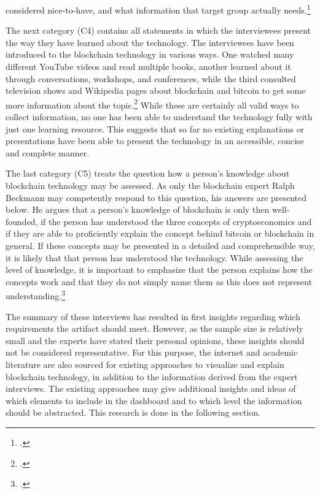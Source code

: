 considered nice-to-have, and what information that target group actually needs.\footcites[Cf.][P80, P81, P87]{BjoernPaulewicz_Interview}[cf.][P120]{RalphBeckmann_Interview}

The next category (C4) contains all statements in which the interviewees present the way they have learned about the technology. The interviewees have been introduced to the blockchain technology in various ways. One watched many different YouTube videos and read multiple books, another learned about it through conversations, workshops, and conferences, while the third consulted television shows and Wikipedia pages about blockchain and bitcoin to get some more information about the topic.\footcites[Cf.][P6]{BjoernPaulewicz_Interview}[cf.][P72, P90]{BjoernPaulewicz_Interview}[cf.][P93, P94, P101]{RalphBeckmann_Interview} While these are certainly all valid ways to collect information, no one has been able to understand the technology fully with just one learning resource. This suggests that so far no existing explanations or presentations have been able to present the technology in an accessible, concise and complete manner.

The last category (C5) treats the question how a person's knowledge about blockchain technology may be assessed. As only the blockchain expert Ralph Beckmann may competently respond to this question, his answers are presented below. He argues that a person's knowledge of blockchain is only then well-founded, if the person has understood the three concepts of cryptoeconomics and if they are able to proficiently explain the concept behind bitcoin or blockchain in general. If these concepts may be presented in a detailed and comprehensible way, it is likely that that person has understood the technology. While assessing the level of knowledge, it is important to emphasize that the person explains how the concepts work and that they do not simply name them as this does not represent understanding.\footcites[Cf.][P100, P102, P108, P111, P118, P129, P130]{RalphBeckmann_Interview}

The summary of these interviews has resulted in first insights regarding which requirements the artifact should meet. However, as the sample size is relatively small and the experts have stated their personal opinions, these insights should not be considered representative. For this purpose, the internet and academic literature are also sourced for existing approaches to visualize and explain blockchain technology, in addition to the information derived from the expert interviews. The existing approaches may give additional insights and ideas of which elements to include in the dashboard and to which level the information should be abstracted. This research is done in the following section.

